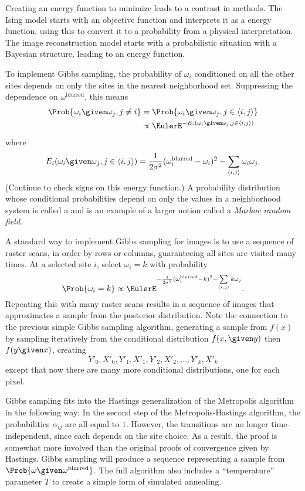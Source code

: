 \documentclass[12pt]{article}
\begin{document}
Creating an energy function to minimize leads to a contrast in methods.
The Ising model starts with an objective function and interprets it as a
energy function, using this to convert it to a probability from a
physical interpretation.  The image reconstruction model starts with a
probabilistic situation with a Bayesian structure, leading to an energy
function.

To implement Gibbs sampling, the probability of \( \omega_i \)
conditioned on all the other sites depends on only the sites in the
nearest neighborhood set.  Suppressing the dependence on \( \omega^{\text
{blurred}} \), this means
\begin{align*}
    \Prob{\omega_i \given \omega_j, j \ne i } &= \Prob { \omega_i \given
    \omega_j, j \in \langle i,j \rangle } \\
    & \propto \EulerE^{-E_i(\omega_i \given \omega_j, j \in \langle i,j
    \rangle)}
\end{align*}
where
\[
    E_i(\omega_i \given \omega_j, j \in \langle i,j \rangle) = \frac{1}{2\sigma^2}
    (\omega_i^{\text{blurred}}-\omega_i)^2 - \sum\limits_{\langle i, j
    \rangle} \omega_i\omega_j.
\] (Continue to check signs on this energy function.) A probability
distribution whose conditional probabilities depend on only the values
in a neighborhood system is called a %
and is an example of a larger notion called a \emph{Markov random field}.%

A standard way to implement Gibbs sampling for images is to use a
sequence of raster scans, in order by rows or columns, guaranteeing all
sites are visited many times.  At a selected site \( i \), select \(
\omega_i = k \) with probability
\[
    \Prob{\omega_i = k} \propto \EulerE^{-\frac{1}{2\sigma^2}(\omega_i^{\text
    {blurred}}-k)^2 - \sum\limits_{\langle i, j \rangle} k \omega_j}.
\] Repeating this with many raster scans results in a sequence of images
that approximates a sample from the posterior distribution.  Note the
connection to the previous simple Gibbs sampling algorithm, generating a
sample from \( f(x) \) by sampling iteratively from the conditional
distribution \( f(x, \given y) \) then \( f(y \given x) \), creating
\[
    Y'_0, X'_0, Y'_1, X'_1, Y'_2, X'_2, \dots, Y'_k, X'_k
\] except that now there are many more conditional distributions, one
for each pixel.

Gibbs sampling fits into the Hastings generalization of the Metropolis
algorithm in the following way:  In the second step of the
Metropolis-Hastings algorithm, the probabilities \( \alpha_{ij} \) are
all equal to \( 1 \).  However, the transitions are no longer
time-independent, since each depends on the site choice.  As a result,
the proof is somewhat more involved than the original proofs of
convergence given by Hastings.  Gibbs sampling will produce a sequence
representing a sample from \( \Prob{\omega \given \omega^{\text{blurred}}}
\).  The full algorithm also includes a ``temperature'' parameter \( T \)
to create a simple form of simulated annealing.
\end{document}
